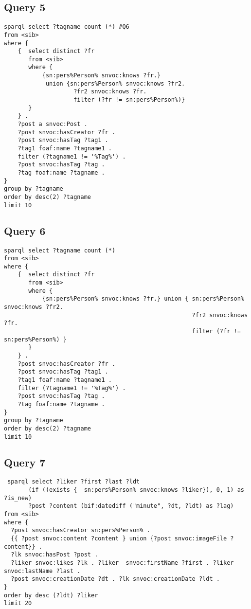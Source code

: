 \subsection{Query 5}
\begin{verbatim}
sparql select ?tagname count (*) #Q6
from <sib>
where {  
    {  select distinct ?fr
       from <sib>
       where {
           {sn:pers%Person% snvoc:knows ?fr.} 
            union {sn:pers%Person% snvoc:knows ?fr2. 
                    ?fr2 snvoc:knows ?fr. 
                    filter (?fr != sn:pers%Person%)}
       }
    } .
    ?post a snvoc:Post .
    ?post snvoc:hasCreator ?fr .
    ?post snvoc:hasTag ?tag1 .
    ?tag1 foaf:name ?tagname1 .
    filter (?tagname1 != '%Tag%') .
    ?post snvoc:hasTag ?tag .
    ?tag foaf:name ?tagname .
}
group by ?tagname
order by desc(2) ?tagname
limit 10
\end{verbatim}
 

\subsection{Query 6}
\begin{verbatim}
sparql select ?tagname count (*) 
from <sib>
where {  
    {  select distinct ?fr
       from <sib>
       where {
           {sn:pers%Person% snvoc:knows ?fr.} union { sn:pers%Person% snvoc:knows ?fr2.
                                                      ?fr2 snvoc:knows ?fr.
                                                      filter (?fr != sn:pers%Person%) }
       }
    } .
    ?post snvoc:hasCreator ?fr .
    ?post snvoc:hasTag ?tag1 .
    ?tag1 foaf:name ?tagname1 .
    filter (?tagname1 != '%Tag%') .
    ?post snvoc:hasTag ?tag .
    ?tag foaf:name ?tagname .
}
group by ?tagname
order by desc(2) ?tagname
limit 10
\end{verbatim}




\subsection{Query 7}
\begin{verbatim}
 sparql select ?liker ?first ?last ?ldt 
       (if ((exists {  sn:pers%Person% snvoc:knows ?liker}), 0, 1) as ?is_new)
       ?post ?content (bif:datediff ("minute", ?dt, ?ldt) as ?lag) 
from <sib>
where {
  ?post snvoc:hasCreator sn:pers%Person% .
  {{ ?post snvoc:content ?content } union {?post snvoc:imageFile ?content}} .
  ?lk snvoc:hasPost ?post .
  ?liker snvoc:likes ?lk . ?liker  snvoc:firstName ?first . ?liker snvoc:lastName ?last . 
  ?post snvoc:creationDate ?dt . ?lk snvoc:creationDate ?ldt .
}
order by desc (?ldt) ?liker
limit 20
\end{verbatim}

